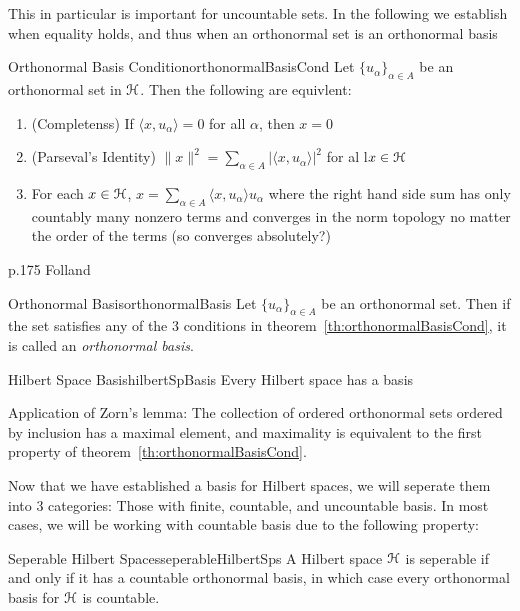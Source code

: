 \documentclass[oneside]{book}
\newcommand{\EH}{\EuScript{H}}
\begin{document}
This in particular is important for uncountable sets. In the following we establish when equality holds, and thus when
an orthonormal set is an orthonormal basis

\begin{thm}{Orthonormal Basis Condition}{orthonormalBasisCond}
Let $\{u_\alpha\}_{\alpha \in A}$ be an orthonormal set in $\EH$. Then the following are equivlent:
\begin{enumerate}
	\item (Completenss) If $\langle x, u_\alpha \rangle = 0$ for all $\alpha$, then $x = 0$
	\item (Parseval's Identity) $\|x\|^2 = \sum_{\alpha \in A} |\langle x, u_\alpha \rangle|^2$ for al l$x \in \EH$
	\item For each $x \in \EH$, $x = \sum_{\alpha \in A} \langle x, u_\alpha \rangle u_\alpha$ where the right hand
		side sum has only countably many nonzero terms and converges in the norm topology no matter the order of the
		terms (so converges absolutely?)
\end{enumerate}
\end{thm}

\begin{Proof}
p.175 Folland
\end{Proof}

\begin{defn}{Orthonormal Basis}{orthonormalBasis}
Let $\{u_\alpha\}_{\alpha \in A}$ be an orthonormal set. Then if the set satisfies any of the 3 conditions in
theorem~\ref{th:orthonormalBasisCond}, it is called an \emph{orthonormal basis}.
\end{defn}


\begin{thm}{Hilbert Space Basis}{hilbertSpBasis}
Every Hilbert space has a basis
\end{thm}

\begin{Proof}
Application of Zorn's lemma: The collection of ordered orthonormal sets ordered by inclusion has a maximal element,
and maximality is equivalent to the first property of theorem~\ref{th:orthonormalBasisCond}.
\end{Proof}

Now that we have established a basis for Hilbert spaces, we will seperate them into 3 categories: Those with finite,
countable, and uncountable basis. In most cases, we will be working with countable basis due to the following property:

\begin{prop}{Seperable Hilbert Spaces}{seperableHilbertSps}
A Hilbert space $\EH$ is seperable if and only if it has a countable orthonormal basis, in which case every
orthonormal basis for $\EH$ is countable.
\end{prop}
\end{document}
